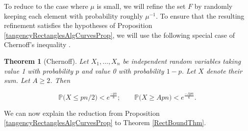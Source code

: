 \documentclass[letterpaper, reqno,11pt]{article}
\numberwithin{equation}{section}
\newtheorem{thm}{Theorem}
\numberwithin{thm}{section}
\theoremstyle{remark}
\begin{document}
To reduce to the case where $\mu$ is small, we will refine the set $F$ by randomly keeping each element with probability roughly $\mu^{-1}$. To ensure that the resulting refinement satisfies the hypotheses of Proposition \ref{tangencyRectanglesAlgCurvesProp}, we will use the following special case of Chernoff’s inequality \cite{Cher}.


\begin{thm}[Chernoff]\label{ChernoffThm}
Let $X_1,\ldots,X_n$ be independent random variables taking value 1 with probability $p$ and value 0 with probability $1-p$. Let $X$ denote their sum. Let $A\geq 2$. Then


\begin{equation}\label{ChernoffBd}
\mathbb{P}\big(X \leq pn/2  \big)  < e^{\frac{-pn}{8}};\qquad \mathbb{P}\big(X \geq Apn \big)  < e^{\frac{-Apn}{6}}.
\end{equation}
\end{thm}


We can now explain the reduction from Proposition \ref{tangencyRectanglesAlgCurvesProp} to Theorem \ref{RectBoundThm}.

\end{document}

